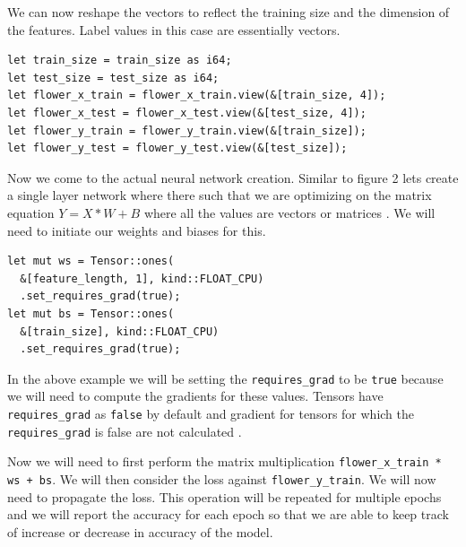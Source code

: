 \documentclass{book}
\begin{document}
We can now reshape the vectors to reflect the training size and the dimension of the features. Label values in this case are essentially vectors.

\begin{lstlisting}[caption={chapter3\\/iris\_classification\_tchrs\\/src\\/main\\.rs}]
let train_size = train_size as i64;
let test_size = test_size as i64;
let flower_x_train = flower_x_train.view(&[train_size, 4]);
let flower_x_test = flower_x_test.view(&[test_size, 4]);
let flower_y_train = flower_y_train.view(&[train_size]);
let flower_y_test = flower_y_test.view(&[test_size]);
\end{lstlisting}

Now we come to the actual neural network creation. Similar to figure 2 lets create a single layer network where there such that we are optimizing on the matrix equation $Y = X * W + B$ where all the values are vectors or matrices\cite{WEBSITE:14} . We will need to initiate our weights and biases for this.

\begin{lstlisting}[caption={chapter3\\/iris\_classification\_tchrs\\/src\\/main\\.rs}]
let mut ws = Tensor::ones(
  &[feature_length, 1], kind::FLOAT_CPU)
  .set_requires_grad(true);
let mut bs = Tensor::ones(
  &[train_size], kind::FLOAT_CPU)
  .set_requires_grad(true);
\end{lstlisting}

In the above example we will be setting the \lstinline{requires_grad} to be \lstinline{true} because we will need to compute the gradients for these values. Tensors have \lstinline{requires_grad} as \lstinline{false} by default and gradient for tensors for which the \lstinline{requires_grad} is false are not calculated\cite{WEBSITE:13} .

Now we will need to first perform the matrix multiplication \lstinline{flower_x_train * ws + bs}. We will then consider the loss against \lstinline{flower_y_train}. We will now need to propagate the loss. This operation will be repeated for multiple epochs and we will report the accuracy for each epoch so that we are able to keep track of increase or decrease in accuracy of the model.
\end{document}
